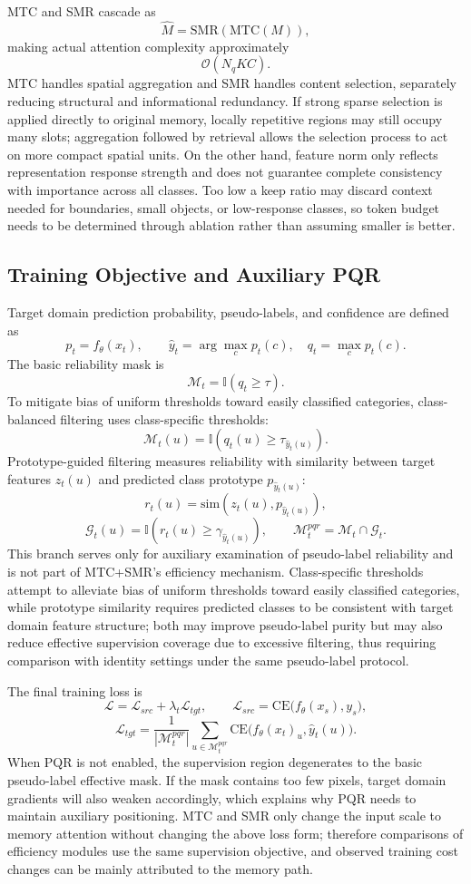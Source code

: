 MTC and SMR cascade as
\[
\hat{M}=\mathrm{SMR}(\mathrm{MTC}(M)),
\]
making actual attention complexity approximately
\[
\mathcal{O}(N_qKC).
\]
MTC handles spatial aggregation and SMR handles content selection, separately reducing structural and informational redundancy. If strong sparse selection is applied directly to original memory, locally repetitive regions may still occupy many slots; aggregation followed by retrieval allows the selection process to act on more compact spatial units. On the other hand, feature norm only reflects representation response strength and does not guarantee complete consistency with importance across all classes. Too low a keep ratio may discard context needed for boundaries, small objects, or low-response classes, so token budget needs to be determined through ablation rather than assuming smaller is better.

\subsection{Training Objective and Auxiliary PQR}
Target domain prediction probability, pseudo-labels, and confidence are defined as
\[
p_t=f_{\theta}(x_t),\qquad
\hat{y}_t=\arg\max_c p_t(c),\quad q_t=\max_c p_t(c).
\]
The basic reliability mask is~\cite{zou2018cbst,hoyer2023mic,zheng2025sfuda360pp}
\[
\mathcal{M}_t=\mathbb{I}(q_t\geq\tau).
\]
To mitigate bias of uniform thresholds toward easily classified categories, class-balanced filtering uses class-specific thresholds:
\[
\mathcal{M}_t(u)=\mathbb{I}\!\left(q_t(u)\geq\tau_{\hat{y}_t(u)}\right).
\]
Prototype-guided filtering measures reliability with similarity between target features $z_t(u)$ and predicted class prototype $p_{\hat{y}_t(u)}$:
\[
r_t(u)=\mathrm{sim}\!\left(z_t(u),p_{\hat{y}_t(u)}\right),
\]
\[
\mathcal{G}_t(u)=\mathbb{I}\!\left(r_t(u)\geq\gamma_{\hat{y}_t(u)}\right),\qquad
\mathcal{M}^{pqr}_t=\mathcal{M}_t\cap\mathcal{G}_t.
\]
This branch serves only for auxiliary examination of pseudo-label reliability and is not part of MTC+SMR's efficiency mechanism. Class-specific thresholds attempt to alleviate bias of uniform thresholds toward easily classified categories, while prototype similarity requires predicted classes to be consistent with target domain feature structure; both may improve pseudo-label purity but may also reduce effective supervision coverage due to excessive filtering, thus requiring comparison with identity settings under the same pseudo-label protocol.

The final training loss is
\[
\mathcal{L}=\mathcal{L}_{src}+\lambda_t\mathcal{L}_{tgt},
\qquad
\mathcal{L}_{src}=\mathrm{CE}\big(f_{\theta}(x_s),y_s\big),
\]
\[
\mathcal{L}_{tgt}
=
\frac{1}{|\mathcal{M}^{pqr}_t|}
\sum_{u\in\mathcal{M}^{pqr}_t}
\mathrm{CE}\big(f_{\theta}(x_t)_u,\hat{y}_t(u)\big).
\]
When PQR is not enabled, the supervision region degenerates to the basic pseudo-label effective mask. If the mask contains too few pixels, target domain gradients will also weaken accordingly, which explains why PQR needs to maintain auxiliary positioning. MTC and SMR only change the input scale to memory attention without changing the above loss form; therefore comparisons of efficiency modules use the same supervision objective, and observed training cost changes can be mainly attributed to the memory path.
